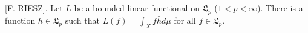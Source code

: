 [F. RIESZ]. Let $L$ be a bounded linear functional on $\mathfrak{L}_p$ ($1 < p < \infty$). There is a function $h \in \mathfrak{L}_p$ such that $L(f) = \int_X f \bar{h} d\mu$ for all $f \in \mathfrak{L}_p$.